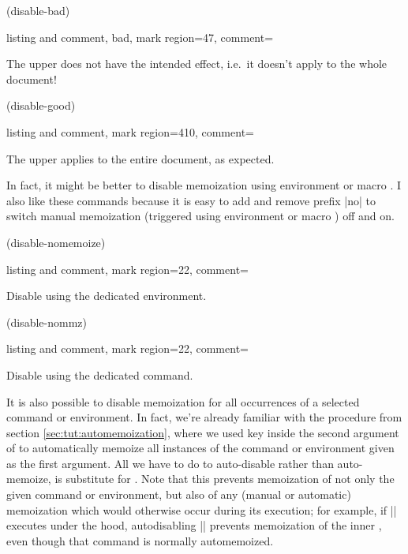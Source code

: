 \documentclass[a4paper,11pt]{article}
\begin{document}

\begin{tcbraster}[raster columns=2, raster equal height=rows]
  \tcbinputexample(disable-bad){
    listing and comment, bad, mark region={4}{7},
    comment={\raggedright The upper 
      does not have the intended effect,
      i.e.\ it doesn't apply to the whole document!}}
  \tcbinputexample(disable-good){
    listing and comment, mark region={4}{10},
    comment={\raggedright The upper  applies
      to the entire document, as expected.}}
\end{tcbraster}

In fact, it might be better to disable memoization using environment
 or macro .  I also like these
commands because it is easy to add and remove prefix |no| to switch manual
memoization (triggered using environment  or macro
) off and on.

\begin{tcbraster}[raster columns=2, raster equal height=rows]
  \tcbinputexample(disable-nomemoize){listing and comment, mark region={2}{2},
    comment=\raggedright Disable using the dedicated environment.}
  \tcbinputexample(disable-nommz){listing and comment, mark region={2}{2},
    comment=\raggedright Disable using the dedicated command.}
\end{tcbraster}

It is also possible to disable memoization for all occurrences of a selected
command or environment.  In fact, we're already familiar with the procedure
from section \ref{sec:tut:automemoization}, where we used key
 inside the second argument of  to
automatically memoize all instances of the command or environment given as the
first argument.  All we have to do to auto-disable rather than auto-memoize, is
substitute  for .  Note that this
prevents memoization of not only the given command or environment, but also of
any (manual or automatic) memoization which would otherwise occur during its
execution; for example, if |\foo| executes  under the hood,
autodisabling |\foo| prevents memoization of the inner , even though
that command is normally automemoized.
\end{document}
